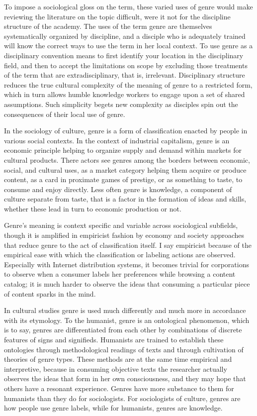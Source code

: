 \documentclass[]{book}
\theoremstyle{definition}
\theoremstyle{definition}
\theoremstyle{definition}
\theoremstyle{remark}
\begin{document}
To impose a sociological gloss on the term, these varied uses of genre
would make reviewing the literature on the topic difficult, were it not
for the discipline structure of the academy. The uses of the term genre
are themselves systematically organized by discipline, and a disciple
who is adequately trained will know the correct ways to use the term in
her local context. To use genre as a disciplinary convention means to
first identify your location in the disciplinary field, and then to
accept the limitations on scope by excluding those treatments of the
term that are extradisciplinary, that is, irrelevant. Disciplinary
structure reduces the true cultural complexity of the meaning of genre
to a restricted form, which in turn allows humble knowledge workers to
engage upon a set of shared assumptions. Such simplicity begets new
complexity as disciples spin out the consequences of their local use of
genre.

In the sociology of culture, genre is a form of classification enacted
by people in various social contexts. In the context of industrial
capitalism, genre is an economic principle helping to organize supply
and demand within markets for cultural products. There actors see genres
among the borders between economic, social, and cultural uses, as a
market category helping them acquire or produce content, as a card in
proximate games of prestige, or as something to taste, to consume and
enjoy directly. Less often genre is knowledge, a component of culture
separate from taste, that is a factor in the formation of ideas and
skills, whether these lead in turn to economic production or not.

Genre's meaning is context specific and variable across sociological
subfields, though it is amplified in empiricist fashion by economy and
society approaches that reduce genre to the act of classification
itself. I say empiricist because of the empirical ease with which the
classification or labeling actions are observed. Especially with
Internet distribution systems, it becomes trivial for corporations to
observe when a consumer labels her preferences while browsing a content
catalog; it is much harder to observe the ideas that consuming a
particular piece of content sparks in the mind.

In cultural studies genre is used much differently and much more in
accordance with its etymology. To the humanist, genre is an ontological
phenomenon, which is to say, genres are differentiated from each other
by combinations of discrete features of signs and signifieds. Humanists
are trained to establish these ontologies through methodological
readings of texts and through cultivation of theories of genre types.
These methods are at the same time empirical and interpretive, because
in consuming objective texts the researcher actually observes the ideas
that form in her own consciousness, and they may hope that others have a
resonant experience. Genres have more substance to them for humanists
than they do for sociologists. For sociologists of culture, genres are
how people use genre labels, while for humanists, genres are knowledge.
\end{document}
